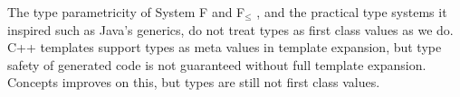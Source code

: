 The type parametricity of System F and F$_\le$ \cite{Cardelli-1985}, and the practical type
systems it inspired such as Java's generics, do not treat types as first class values as we do.
C++ templates support types as meta values in template expansion, but type safety of generated
code is not guaranteed without full template expansion. Concepts \cite{gregor06:_concepts}
improves on this, but types are still not first class values.



%

